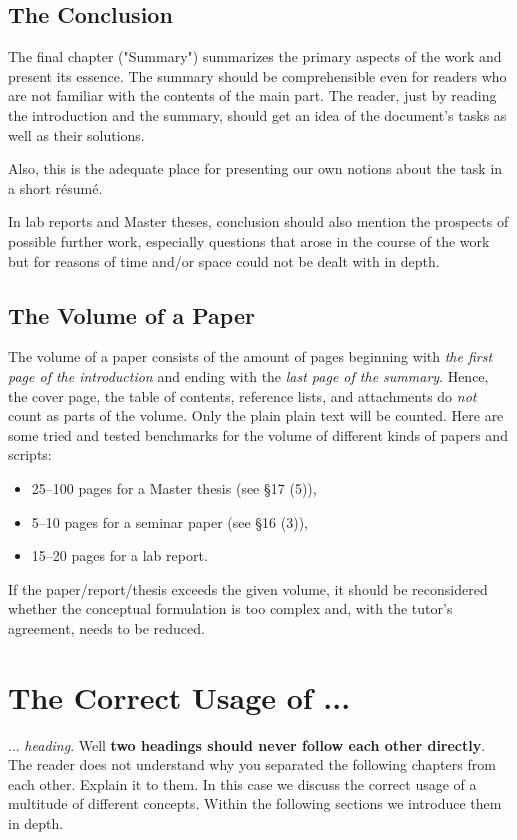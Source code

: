 \section{The Conclusion}

The final chapter ("Summary") summarizes the primary aspects of the work
and present its essence. The summary should be comprehensible even for readers who
are not familiar with the contents of the main part. The reader, just by reading the
introduction and the summary, should get an idea of the document's tasks as well as
their solutions.

Also, this is the adequate place for presenting our own notions about the task in a 
short résumé.

In lab reports and Master theses, conclusion should also mention the prospects
of possible further work, especially questions that arose in the course of the
work but for reasons of time and/or space could not be dealt with in depth.

\section{The Volume of a Paper}
The volume of a paper consists of the amount of pages beginning with \emph{the first page of the introduction} and ending with the \emph{last page of the summary}. Hence, the cover page, the table of contents, reference lists, and attachments do \emph{not} count as parts of the volume. Only the plain plain text will be counted. Here are some tried and tested benchmarks for the volume of different kinds of papers and scripts:

\begin{itemize}
\item 25--100 pages for a Master thesis (see \cite{mpo11} \S 17 (5)),
\item 5--10 pages for a seminar paper (see \cite{mpo11} \S 16 (3)),
\item 15--20 pages for a lab report.
\end{itemize}

If the paper/report/thesis exceeds the given volume, it should be reconsidered whether the conceptual formulation is too complex and, with the tutor's agreement, needs to be reduced.

\chapter{The Correct Usage of ...}
... \emph{heading}. Well \textbf{two headings should never follow each other directly}. The reader does not understand why you separated the following chapters from each other. Explain it to them. In this case we discuss the correct usage of a multitude of different concepts. Within the following sections we introduce them in depth.

